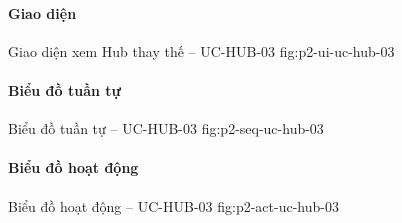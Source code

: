 \par\medskip
\noindent\begin{minipage}{\linewidth}
\paragraph{Giao diện}
  {Giao diện xem Hub thay thế -- UC-HUB-03}
  {fig:p2-ui-uc-hub-03}
  {}
\end{minipage}\par

\clearpage
\paragraph{Biểu đồ tuần tự}
  {Biểu đồ tuần tự -- UC-HUB-03}
  {fig:p2-seq-uc-hub-03}

\clearpage
\paragraph{Biểu đồ hoạt động}
  {Biểu đồ hoạt động -- UC-HUB-03}
  {fig:p2-act-uc-hub-03}

\clearpage
